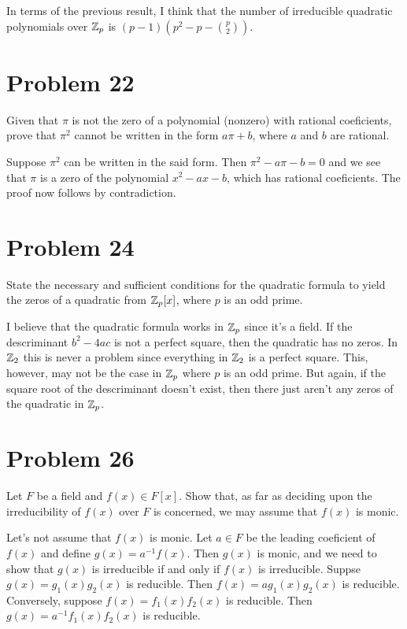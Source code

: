 \documentclass{article}
\begin{document}
In terms of the previous result, I think that the number of irreducible quadratic polynomials over $\mathbb{Z}_p$
is $(p-1)\left(p^2-p-\binom{p}{2}\right)$.


\section*{Problem 22}

Given that $\pi$ is not the zero of a polynomial (nonzero) with rational
coeficients, prove that $\pi^2$ cannot be written in the form $a\pi+b$, where
$a$ and $b$ are rational.

Suppose $\pi^2$ can be written in the said form.  Then $\pi^2-a\pi-b=0$ and we see
that $\pi$ is a zero of the polynomial $x^2-ax-b$, which has rational coeficients.
The proof now follows by contradiction.

\section*{Problem 24}

State the necessary and sufficient conditions for the quadratic formula to yield the zeros of a
quadratic from $\mathbb{Z}_p[x]$, where $p$ is an odd prime.

I believe that the quadratic formula works in $\mathbb{Z}_p$ since it's a field.
If the descriminant $b^2-4ac$
is not a perfect square, then the quadratic has no zeros.  In $\mathbb{Z}_2$ this is never
a problem since everything in $\mathbb{Z}_2$ is a perfect square.  This, however, may not
be the case in $\mathbb{Z}_p$ where $p$ is an odd prime.  But again, if the square root
of the descriminant doesn't exist, then there just aren't any zeros of the
quadratic in $\mathbb{Z}_p$.

\section*{Problem 26}

Let $F$ be a field and $f(x)\in F[x]$.  Show that, as far as deciding upon the
irreducibility of $f(x)$ over $F$ is concerned, we may assume that $f(x)$ is
monic.

Let's not assume that $f(x)$ is monic.  Let $a\in F$ be the leading coeficient
of $f(x)$ and define $g(x)=a^{-1}f(x)$.  Then $g(x)$ is monic, and we need to
show that $g(x)$ is irreducible if and only if $f(x)$ is irreducible.
Suppse $g(x)=g_1(x)g_2(x)$ is reducible.  Then $f(x)=ag_1(x)g_2(x)$ is reducible.
Conversely, suppose $f(x)=f_1(x)f_2(x)$ is reducible.
Then $g(x)=a^{-1}f_1(x)f_2(x)$ is reducible.
\end{document}
